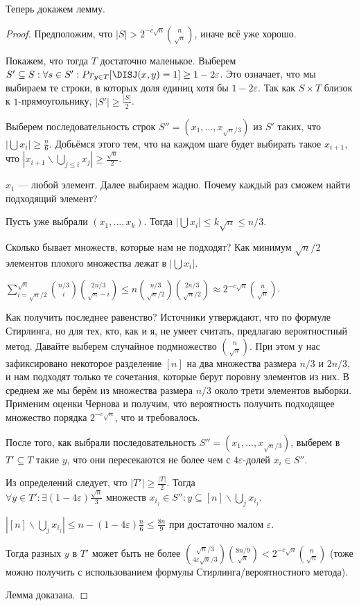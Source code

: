 Теперь докажем лемму.

\begin{proof}

Предположим,  что $|S| > 2^{-c\sqrt{n}} {{n}\choose{\sqrt{n}}}$, иначе всё уже хорошо.

Покажем, что тогда $T$ достаточно маленькое. Выберем $S' \subseteq S : \forall s \in S' : Pr_{y \in T}[\DISJ(x, y) = 1] \geq 1 - 2\varepsilon$. Это означает, что мы выбираем те строки, в которых доля единиц хотя бы $1 - 2\varepsilon$. Так как $S \times T$ близок к $1$-прямоугольнику, $|S'| \geq \frac{|S|}{2}$.

Выберем последовательность строк $S'' = (x_1, \ldots, x_{\sqrt{n}/3})$ из $S'$ таких, что $|\bigcup x_i| \geq \frac{n}{6}$. Добьёмся этого тем, что на каждом шаге будет выбирать такое $x_{i + 1}$, что $|x_{i + 1} \backslash \bigcup_{j \leq i} x_j| \geq \frac{\sqrt{n}}{2}$.

$x_1$ --- любой элемент. Далее выбираем жадно. Почему каждый раз сможем найти подходящий элемент?

Пусть уже выбрали $(x_1, \ldots, x_k)$. Тогда $|\bigcup x_i| \leq k \sqrt{n} \leq n/3$.

Сколько бывает множеств, которые нам не подходят? Как минимум $\sqrt{n}/2$ элементов плохого множества лежат в $|\bigcup x_i|$.

$\sum_{i = \sqrt{n}/2}^{\sqrt{n}}{{n/3}\choose{i}} {{2n/3}\choose{\sqrt{n} - i}} \leq n {{n/3}\choose{\sqrt{n}/2}} {{2n/3}\choose{\sqrt{n}/2}} \approx 2^{-c\sqrt{n}}{{n}\choose{\sqrt{n}}}$.

Как получить последнее равенство? Источники утверждают, что по формуле Стирлинга, но для тех, кто, как и я, не умеет считать, предлагаю вероятностный метод. Давайте выберем случайное подмножество ${{n}\choose{\sqrt{n}}}$. При этом у нас зафиксировано некоторое разделение $[n]$ на два множества размера $n/3$ и $2n/3$, и нам подходят только те сочетания, которые берут поровну элементов из них. В среднем же мы берём из множества размера $n/3$ около трети элементов выборки. Применим оценки Чернова и получим, что вероятность получить подходящее множество порядка $2^{-c\sqrt{n}}$, что и требовалось.

После того, как выбрали последовательность $S'' = (x_1, \ldots, x_{\sqrt{n}/3})$, выберем в $T' \subseteq T$ такие $y$, что они пересекаются не более чем с $4\varepsilon$-долей $x_i \in S''$.

Из определений следует, что $|T'| \geq \frac{|T|}{2}$. Тогда $\forall y \in T' :  \exists (1 - 4\varepsilon) \frac{\sqrt{n}}{3} \text{ множеств } x_{i_j} \in S'' : y \subseteq [n] \backslash \bigcup_j x_{i_j}$.

$|[n] \backslash \bigcup_j x_{i_j}| \leq n - (1 - 4\varepsilon)\frac{n}{6} \leq \frac{8n}{9}$ при достаточно малом $\varepsilon$.

Тогда разных $y$ в $T'$ может быть не более ${{\sqrt{n}/3}\choose{4\varepsilon\sqrt{n}/3}}{{8n/9}\choose{\sqrt{n}}} < 2^{-c\sqrt{n}}{{n}\choose{\sqrt{n}}}$ (тоже можно получить с использованием формулы Стирлинга/вероятностного метода).

Лемма доказана.

\end{proof}


